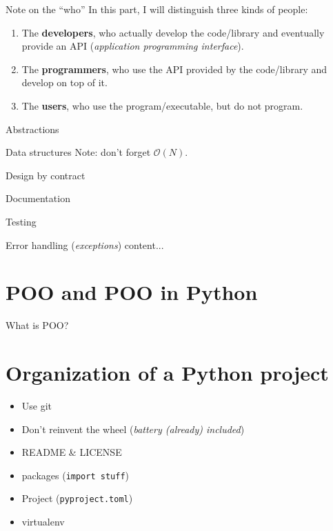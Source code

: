 \documentclass[10pt,
]{beamer}
\begin{document}
\begin{frame}{Note on the ``who''}
	In this  part, I will distinguish three kinds of people:\begin{enumerate}
		\item The \textbf{developers}, who actually develop the code/library and eventually provide an API (\textit{application programming interface}).
		\item The \textbf{programmers}, who use the API provided by the code/library and develop on top of it.
		\item The \textbf{users}, who use the program/executable, but do not program.
	\end{enumerate}
\end{frame}

\begin{frame}{Abstractions}
\end{frame}

\begin{frame}{Data structures}
	Note: don't forget $\mathcal O(N)$.
\end{frame}

\begin{frame}{Design by contract}
\end{frame}

\begin{frame}{Documentation}
\end{frame}

\begin{frame}{Testing}
\end{frame}

\begin{frame}{Error handling (\textit{exceptions})}
	content...
\end{frame}

 \section{POO and POO in Python}
 
 \begin{frame}{What is POO?}
 \end{frame}
 
 \section{Organization of a Python project}
 
 \begin{frame}
 	\begin{itemize}
 		\item Use git
 		\item Don't reinvent the wheel (\textit{battery (already) included})
 		\item README \& LICENSE
 		\item packages (\texttt{import stuff})
 		\item Project (\texttt{pyproject.toml})
 		\item virtualenv
 	\end{itemize}
 \end{frame}
\end{document}
